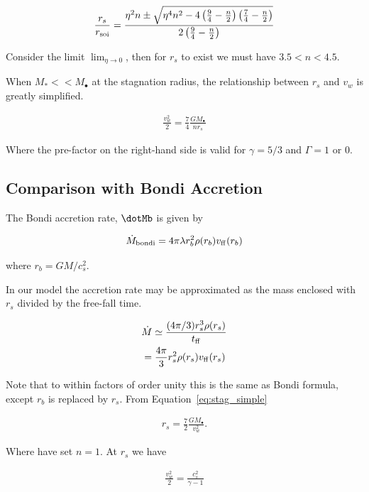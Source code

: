 \documentclass[usenatbib,fleqn]{mn2e}
\newcommand{\Mdotb}{\dot{M}_{\rm bondi}}
\newcommand{\rs}{r_s}
\newcommand{\rb}{r_b}
\newcommand{\vw}{v_w}
\newcommand{\kew}{\frac{v_w^2}{2}}
\newcommand{\Mstar}{M_{*}}
\newcommand{\Mbh}[1][]{M_{\bullet#1}}
\newcommand{\soi}{\rm soi}
\newcommand{\ff}{\rm ff}
\newcommand{\rsoi}{r_{\soi}}
\newcommand{\x}{\frac{r_s}{\rsoi}}
\begin{document}
\begin{align}
\x=\frac{\eta^2 n \pm \sqrt{\eta^4 n^2 -4 \left(\frac{9}{4}-\frac{n}{2}\right) \left(\frac{7}{4}-\frac{n}{2}\right)}}{2\left(\frac{9}{4}-\frac{n}{2}\right)}
\end{align}

Consider the limit $\lim_{\eta \to 0}$, then for $\rs$ to exist we must have $3.5<n<4.5$.

When $\Mstar << \Mbh$ at the stagnation radius, the relationship between $\rs$ and $\vw$ is greatly simplified. 

\begin{align}
\kew=\frac{7}{4}\frac{G \Mbh}{n \rs}
\label{eq:stag_simple}
\end{align}

Where the pre-factor on the right-hand side is valid for $\gamma=5/3$ and $\Gamma=1$ or 0.  


\subsection{Comparison with Bondi Accretion}
The Bondi accretion rate, $\dotMb$ is given by 

\begin{align}
\Mdotb=4\pi \lambda r_b^2 \rho(r_b) v_{\rm ff}(r_b)
\end{align}

where $r_b=G M/c_s^2$.

In our model the accretion rate may be approximated as the mass enclosed with $\rs$ divided by the free-fall time.

\begin{align}
&\dot{M}\simeq\frac{(4 \pi/3) \rs^3 \rho(\rs)}{t_{\ff}}\\
&=\frac{4 \pi}{3} \rs^2 \rho(\rs) v_{\ff}(\rs)
\end{align}

Note that to within factors of order unity this is the same as Bondi formula, except $\rb$ is replaced by $\rs$. 
From Equation~\ref{eq:stag_simple}

\begin{align}
\rs=\frac{7}{2}\frac{G \Mbh}{\vw^2}.
\end{align}

Where have set $n=1$.  At $\rs$ we have

\begin{align}
\kew=\frac{c_s^2}{\gamma-1}
\end{align}
\end{document}
